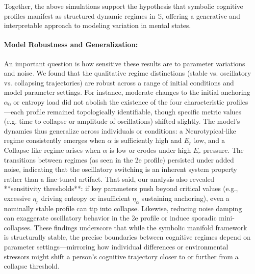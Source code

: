 Together, the above simulations support the hypothesis that symbolic cognitive profiles manifest as structured dynamic regimes in $\mathbb{S}$, offering a generative and interpretable approach to modeling variation in mental states.

\paragraph{Model Robustness and Generalization:} An important question is how sensitive these results are to parameter variations and noise. We found that the qualitative regime distinctions (stable vs. oscillatory vs. collapsing trajectories) are robust across a range of initial conditions and model parameter settings. For instance, moderate changes to the initial anchoring $\alpha_0$ or entropy load did not abolish the existence of the four characteristic profiles—each profile remained topologically identifiable, though specific metric values (e.g. time to collapse or amplitude of oscillations) shifted slightly. The model’s dynamics thus generalize across individuals or conditions: a Neurotypical-like regime consistently emerges when $\alpha$ is sufficiently high and $E_r$ low, and a Collapse-like regime arises when $\alpha$ is low or erodes under high $E_r$ pressure. The transitions between regimes (as seen in the 2e profile) persisted under added noise, indicating that the oscillatory switching is an inherent system property rather than a fine-tuned artifact. That said, our analysis also revealed **sensitivity thresholds**: if key parameters push beyond critical values (e.g., excessive $\eta_r$ driving entropy or insufficient $\eta_\alpha$ sustaining anchoring), even a nominally stable profile can tip into collapse. Likewise, reducing noise damping can exaggerate oscillatory behavior in the 2e profile or induce sporadic mini-collapses. These findings underscore that while the symbolic manifold framework is structurally stable, the precise boundaries between cognitive regimes depend on parameter settings—mirroring how individual differences or environmental stressors might shift a person’s cognitive trajectory closer to or further from a collapse threshold.

